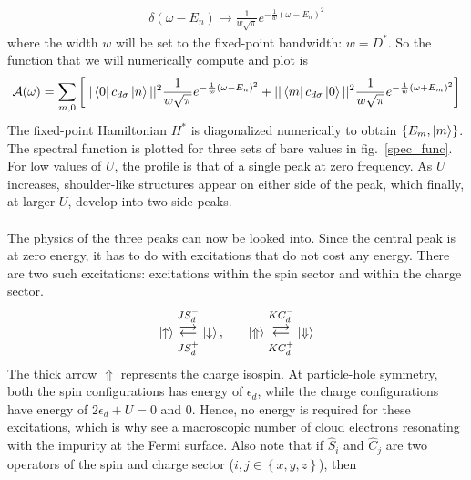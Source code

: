 \documentclass[twoside]{report}
\numberwithin{equation}{section}
\begin{document}
\begin{equation}\begin{aligned}
	\delta(\omega - E_n) \to \frac{1}{w\sqrt \pi}e^{-\frac{1}{w}\left( \omega - E_n \right)^2}
\end{aligned}\end{equation}
where the width \(w\) will be set to the fixed-point bandwidth: \(w = D^*\). So the function that we will numerically compute and plot is
\begin{equation}\begin{aligned}
	\mathcal{A(\omega)} &= \sum_{m,0}\left[||\bra{0}c_{d\sigma}\ket{n}||^2\frac{1}{w\sqrt \pi}e^{-\frac{1}{w}\left( \omega - E_n \right)^2} + ||\bra{m}c_{d\sigma}\ket{0}||^2\frac{1}{w\sqrt \pi}e^{-\frac{1}{w}\left( \omega + E_m \right)^2}\right]\\
\end{aligned}\end{equation}
The fixed-point Hamiltonian \(H^*\) is diagonalized numerically to obtain \(\left\{E_m, \ket{m}\right\}\). The spectral function is plotted for three sets of bare values in fig.~\ref{spec_func}. For low values of \(U\), the profile is that of a single peak at zero frequency. As \(U\) increases, shoulder-like structures appear on either side of the peak, which finally, at larger \(U\), develop into two side-peaks.
\\\\The physics of the three peaks can now be looked into. Since the central peak is at zero energy, it has to do with excitations that do not cost any energy. There are two such excitations: excitations within the spin sector and within the charge sector.
\begin{equation}\begin{aligned}
	\ket{\uparrow} \mathrel{\mathlarger{\mathlarger{\mathop{\rightleftarrows}}^{J S_d^-}_{JS_d^+}}}\ket{\downarrow}, &&&&\ket{\Uparrow} \mathrel{\mathlarger{\mathlarger{\mathop{\rightleftarrows}}^{K C_d^-}_{K C_d^+}}}\ket{\Downarrow}\\
\end{aligned}\end{equation}
The thick arrow \(\Uparrow\) represents the charge isospin. At particle-hole symmetry, both the spin configurations has energy of \(\epsilon_d\), while the charge configurations have energy of \(2\epsilon_d + U=0\) and 0. Hence, no energy is required for these excitations, which is why see a macroscopic number of cloud electrons resonating with the impurity at the Fermi surface. Also note that if \(\hat S_i\) and \(\hat C_j\) are two operators of the spin and charge sector (\(i,j \in \left\{ x,y,z \right\} \)), then
\end{document}
